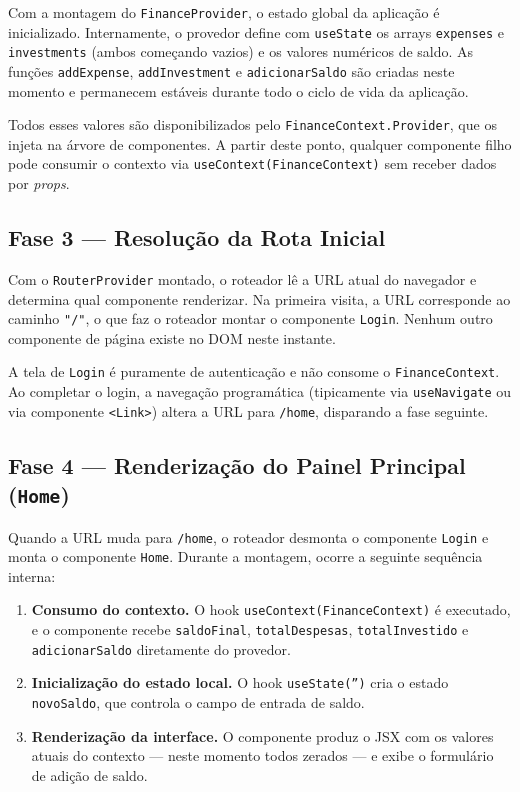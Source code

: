 \documentclass{article}
\begin{document}
Com a montagem do \texttt{FinanceProvider}, o estado global da aplicação é inicializado. Internamente, o provedor define com \texttt{useState} os arrays \texttt{expenses} e \texttt{investments} (ambos começando vazios) e os valores numéricos de saldo. As funções \texttt{addExpense}, \texttt{addInvestment} e \texttt{adicionarSaldo} são criadas neste momento e permanecem estáveis durante todo o ciclo de vida da aplicação.

Todos esses valores são disponibilizados pelo \texttt{FinanceContext.Provider}, que os injeta na árvore de componentes. A partir deste ponto, qualquer componente filho pode consumir o contexto via \texttt{useContext(FinanceContext)} sem receber dados por \textit{props}.

\subsection{Fase 3 — Resolução da Rota Inicial}

Com o \texttt{RouterProvider} montado, o roteador lê a URL atual do navegador e determina qual componente renderizar. Na primeira visita, a URL corresponde ao caminho \texttt{"/"}, o que faz o roteador montar o componente \texttt{Login}. Nenhum outro componente de página existe no DOM neste instante.

A tela de \texttt{Login} é puramente de autenticação e não consome o \texttt{FinanceContext}. Ao completar o login, a navegação programática (tipicamente via \texttt{useNavigate} ou via componente \texttt{<Link>}) altera a URL para \texttt{/home}, disparando a fase seguinte.

\subsection{Fase 4 — Renderização do Painel Principal (\texttt{Home})}

Quando a URL muda para \texttt{/home}, o roteador desmonta o componente \texttt{Login} e monta o componente \texttt{Home}. Durante a montagem, ocorre a seguinte sequência interna:

\begin{enumerate}
  \item \textbf{Consumo do contexto.} O hook \texttt{useContext(FinanceContext)} é executado, e o componente recebe \texttt{saldoFinal}, \texttt{totalDespesas}, \texttt{totalInvestido} e \texttt{adicionarSaldo} diretamente do provedor.

  \item \textbf{Inicialização do estado local.} O hook \texttt{useState('')} cria o estado \texttt{novoSaldo}, que controla o campo de entrada de saldo.

  \item \textbf{Renderização da interface.} O componente produz o JSX com os valores atuais do contexto — neste momento todos zerados — e exibe o formulário de adição de saldo.
\end{enumerate}
\end{document}

